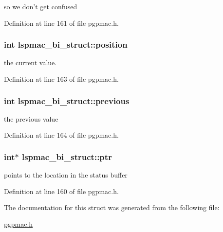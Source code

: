 so we don't get confused 



Definition at line 161 of file pgpmac.\-h.

\hypertarget{structlspmac__bi__struct_a76c4627028b86141c101f1764bebb7b0}{
\subsubsection[{position}]{\setlength{\rightskip}{0pt plus 5cm}int lspmac\-\_\-bi\-\_\-struct\-::position}}\label{structlspmac__bi__struct_a76c4627028b86141c101f1764bebb7b0}


the current value. 



Definition at line 163 of file pgpmac.\-h.

\hypertarget{structlspmac__bi__struct_a00f09cb3d7bdbe1058fb56bb8c2b0fa3}{
\subsubsection[{previous}]{\setlength{\rightskip}{0pt plus 5cm}int lspmac\-\_\-bi\-\_\-struct\-::previous}}\label{structlspmac__bi__struct_a00f09cb3d7bdbe1058fb56bb8c2b0fa3}


the previous value 



Definition at line 164 of file pgpmac.\-h.

\hypertarget{structlspmac__bi__struct_ae201bf05130bcb6985704ea42efabeb3}{
\subsubsection[{ptr}]{\setlength{\rightskip}{0pt plus 5cm}int$\ast$ lspmac\-\_\-bi\-\_\-struct\-::ptr}}\label{structlspmac__bi__struct_ae201bf05130bcb6985704ea42efabeb3}


points to the location in the status buffer 



Definition at line 160 of file pgpmac.\-h.



The documentation for this struct was generated from the following file\-:\begin{DoxyCompactItemize}
\item 
\hyperlink{pgpmac_8h}{pgpmac.\-h}\end{DoxyCompactItemize}
